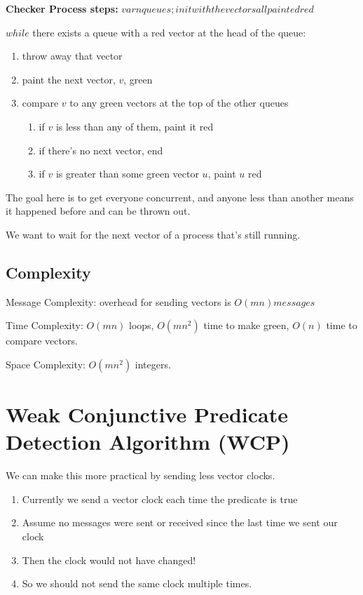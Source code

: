 \documentclass[twoside]{article}
\begin{document}
\textbf{Checker Process steps:}
$var n queues; init with the vectors all painted red$

$while$ there exists a queue with a red vector at the head of the queue:
    \begin{enumerate}
        \item throw away that vector
        \item paint the next vector, $v$, green
        \item compare $v$ to any green vectors at the top of the other queues
            \begin{enumerate}
                 \item if $v$ is less than any of them, paint it red
                   \item if there's no next vector, end
                   \item if $v$ is greater than some green vector $u$, paint $u$ red
        \end{enumerate}
    \end{enumerate}

The goal here is to get everyone concurrent, and anyone less than another means it happened before and can be thrown out.

We want to wait for the next vector of a process that's still running.

\subsection{Complexity}

Message Complexity: overhead for sending vectors is $O(m n) messages$

Time Complexity: $O(m n)$ loops, $O(mn^2)$ time to make green, $O(n)$ time to compare vectors.

Space Complexity: $O(mn^2)$ integers.

\section{Weak Conjunctive Predicate Detection Algorithm (WCP)}

We can make this more practical by sending less vector clocks.

\begin{enumerate}
    \item Currently we send a vector clock each time the predicate is true
    \item Assume no messages were sent or received since the last time we sent our clock
    \item Then the clock would not have changed!
    \item So we should not send the same clock multiple times.
\end{enumerate}
\end{document}

